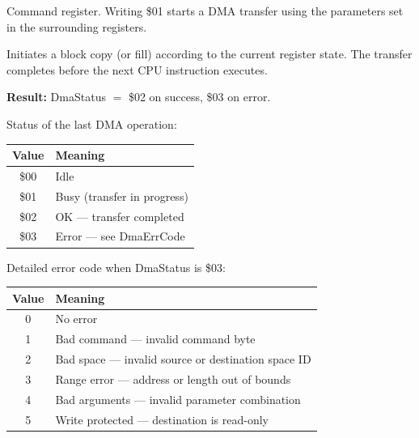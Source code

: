 

Command register.  Writing \$01 starts a DMA transfer using the parameters
set in the surrounding registers.


Initiates a block copy (or fill) according to the current register state.
The transfer completes before the next CPU instruction executes.

\textbf{Result:} DmaStatus $=$ \$02 on success, \$03 on error.



Status of the last DMA operation:

\begin{center}
\small
\begin{tabular}{@{}cl@{}}
\toprule
\textbf{Value} & \textbf{Meaning} \\
\midrule
\$00 & Idle \\
\$01 & Busy (transfer in progress) \\
\$02 & OK --- transfer completed \\
\$03 & Error --- see DmaErrCode \\
\bottomrule
\end{tabular}
\end{center}



Detailed error code when DmaStatus is \$03:

\begin{center}
\small
\begin{tabular}{@{}cl@{}}
\toprule
\textbf{Value} & \textbf{Meaning} \\
\midrule
0 & No error \\
1 & Bad command --- invalid command byte \\
2 & Bad space --- invalid source or destination space ID \\
3 & Range error --- address or length out of bounds \\
4 & Bad arguments --- invalid parameter combination \\
5 & Write protected --- destination is read-only \\
\bottomrule
\end{tabular}
\end{center}

